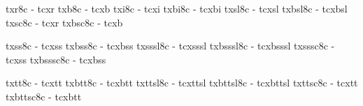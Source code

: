 \registertfm txr8c    - tcxr   %
\registertfm txb8c    - tcxb   %
\registertfm txi8c    - tcxi   %
\registertfm txbi8c   - tcxbi  %
\registertfm txsl8c   - tcxsl  %
\registertfm txbsl8c  - tcxbsl %
\registertfm txsc8c   - tcxr   %
\registertfm txbsc8c  - tcxb   %

\registertfm txss8c    - tcxss    %
\registertfm txbss8c   - tcxbss   %
\registertfm txsssl8c  - tcxsssl  %
\registertfm txbsssl8c - tcxbsssl %
\registertfm txsssc8c  - tcxss    %
\registertfm txbsssc8c - tcxbss   %

\registertfm txtt8c    - tcxtt    %
\registertfm txbtt8c   - tcxbtt   %
\registertfm txttsl8c  - tcxttsl  %
\registertfm txbttsl8c - tcxbttsl %
\registertfm txttsc8c  - tcxtt    %
\registertfm txbttsc8c - tcxbtt   %

\def\loadTXnormalmath{%
  \loadmathfam 0[/txr]%
  \defaultskewchar=128
  \loadmathfam 1[/txmi]%
  \defaultskewchar=48
  \loadmathfam 2[/txsy]%
  \defaultskewchar=-1
  \noindexsize\loadmathfam 3[/txex]%
  \chardef\itfam    4 
  \loadmathfam \itfam [/txi]%
  \chardef\bffam    5
  \loadmathfam \bffam [/txb]%
  \chardef\bifam   6 
  \loadmathfam \bifam    [/txbi]%
  \chardef\msamfam  7
  \loadmathfam \msamfam  [/txsya]%
  \chardef\msbmfam  8
  \loadmathfam \msbmfam  [/txsyb]%
  \chardef\txsycfam 9
  \loadmathfam \txsycfam [/txsyc]%
  \chardef\txmiafam 10
  \loadmathfam \txmiafam [/txmia]%
  \chardef\txexafam 11
  \loadmathfam \txexafam [/txexa]%
  \let\slfam\undefined  \let\ttfam\undefined
  \lastfam =11 %
}
\def\loadTXboldmath{%
  \loadmathfam 0[/txb]%
  \defaultskewchar=127
  \loadmathfam 1[/txbmi]%
  \defaultskewchar=48
  \loadmathfam 2[/txbsy]%
  \defaultskewchar=-1
  \noindexsize\loadmathfam 3[/txbex]%
  \chardef\itfam    4 
  \loadmathfam \itfam [/txbi]%
  \chardef\msamfam  7
  \loadmathfam \msamfam  [/txbsya]%
  \chardef\msbmfam  8
  \loadmathfam \msbmfam  [/txbsyb]%
  \chardef\txsycfam 9
  \loadmathfam \txsycfam [/txbsyc]%
  \chardef\txmiafam 10
  \loadmathfam \txmiafam [/txbmia]%
  \chardef\txexafam 11
  \loadmathfam \txexafam [/txbexa]%
  \chardef\bffam=0 \let\bifam=\itfam
  \let\slfam\undefined  \let\ttfam\undefined
  \lastfam =11 %
}
